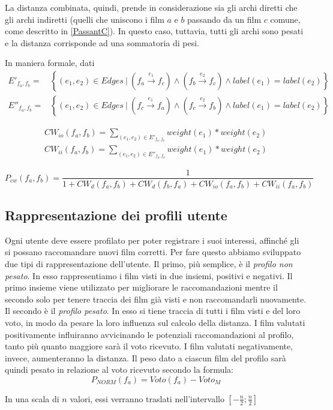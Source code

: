 La distanza combinata, quindi, prende in considerazione sia gli archi diretti che gli archi indiretti (quelli che uniscono i film $a$ e $b$ passando da un film $c$ comune, come descritto in \ref{PassantC}). In questo caso, tuttavia, tutti gli archi sono pesati e la distanza corrisponde ad una sommatoria di pesi.

In maniera formale, dati
\begin{eqnarray*}
E'_{f_a,f_b} = & \left\{ (e_1, e_2) \in Edges ~ \big\vert ~ (f_a \xrightarrow{e_1} f_c) \wedge (f_b \xrightarrow{e_2} f_c) \wedge label(e_1)=label(e_2) \right\} \\
E''_{f_a,f_b} = & \left\{ (e_1, e_2) \in Edges ~ \big\vert ~ (f_c \xrightarrow{e_1} f_a) \wedge (f_c \xrightarrow{e_2} f_b) \wedge label(e_1)=label(e_2) \right\}
\end{eqnarray*}

\begin{eqnarray*}
CW_{io}(f_a,f_b) = \sum_{(e_1,e_2) \in E'_{f_a,f_b}}{weight(e_1)*weight(e_2)}\\
CW_{ii}(f_a,f_b) = \sum_{(e_1,e_2) \in E''_{f_a,f_b}}{weight(e_1)*weight(e_2)}
\end{eqnarray*}

\begin{equation*}
P_{cw}(f_{a},f_{b}) = \frac{1} {1+CW_{d}(f_a,f_b)+CW_{d}(f_b,f_a)+CW_{io}(f_a,f_b)+CW_{ii}(f_a,f_b)}
\end{equation*}

\subsection{Rappresentazione dei profili utente}
\label{profili}

Ogni utente deve essere profilato per poter registrare i suoi interessi,
affinché gli si possano raccomandare nuovi film corretti.
Per fare questo abbiamo sviluppato due tipi di rappresentazione dell'utente.
\label{nonpesato}
Il primo, più semplice, è il \emph{profilo non pesato}. In esso rappresentiamo i film visti in due insiemi, positivi e negativi. Il primo insieme viene utilizzato per migliorare le raccomandazioni mentre il secondo solo per tenere traccia dei film già visti e non raccomandarli nuovamente.
\label{pesato}
Il secondo è il \emph{profilo pesato}. In esso si tiene traccia di tutti i film
visti e del loro voto, in modo da pesare la loro influenza sul calcolo della
distanza. I film valutati positivamente influiranno avvicinando le potenziali raccomandazioni al profilo, tanto più quanto maggiore sarà il voto ricevuto. I film valutati negativamente, invece, aumenteranno la distanza.
Il peso dato a ciascun film del profilo sarà quindi pesato in relazione al voto ricevuto secondo la formula:
$$
P_{NORM}(f_a) = Voto(f_a)- Voto_M
$$

In una scala di $n$ valori, essi verranno traslati nell'intervallo $\left[-\frac{n}{2};\frac{n}{2}\right]$
